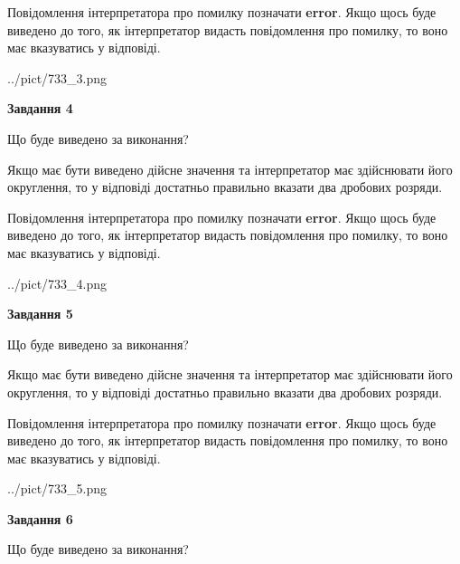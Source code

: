 \documentclass[12pt, ukrainian]{article}
\begin{document}
{\begin {Large}
Повідомлення інтерпретатора про помилку позначати \textbf{error}.
Якщо щось буде виведено до того, як інтерпретатор видасть повідомлення про помилку, 
то воно має вказуватись у відповіді. \par

\begin{center}
	{../pict/733_3.png}
\end{center}
\newpage

{\begin {center}\textbf{Завдання 4}\end {center}}\par
Що буде виведено за виконання? \par

Якщо має бути виведено дійсне значення та інтерпретатор має здійснювати його округлення, 
то у відповіді достатньо правильно вказати два дробових розряди.

Повідомлення інтерпретатора про помилку позначати \textbf{error}.
Якщо щось буде виведено до того, як інтерпретатор видасть повідомлення про помилку, 
то воно має вказуватись у відповіді. \par

\begin{center}
	{../pict/733_4.png}
\end{center}
\newpage

{\begin {center}\textbf{Завдання 5}\end {center}}\par
Що буде виведено за виконання? \par

Якщо має бути виведено дійсне значення та інтерпретатор має здійснювати його округлення, 
то у відповіді достатньо правильно вказати два дробових розряди.

Повідомлення інтерпретатора про помилку позначати \textbf{error}.
Якщо щось буде виведено до того, як інтерпретатор видасть повідомлення про помилку, 
то воно має вказуватись у відповіді. \par

\begin{center}
	{../pict/733_5.png}
\end{center}
\newpage

{\begin {center}\textbf{Завдання 6}\end {center}}\par
Що буде виведено за виконання? \par


\end{Large}}
\end{document}
